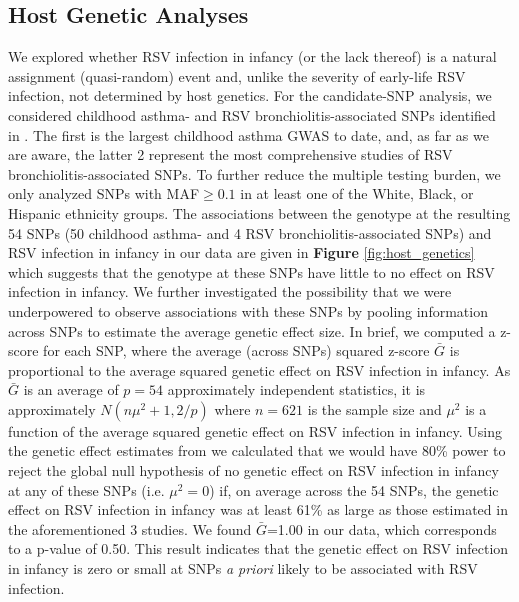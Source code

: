 \documentclass{article} %
\begin{document}
\clearpage	

\subsection{Host Genetic Analyses}
We explored whether RSV infection in infancy (or the lack thereof) is a natural assignment (quasi-random) event and, unlike the severity of early-life RSV infection,
\citep{larkin2015genes}
not determined by host genetics. 
For the candidate-SNP analysis, we considered childhood asthma- and RSV bronchiolitis-associated SNPs identified in 
\citet{pividori2019shared, janssen2007genetic, pasanen2017genome}.
The first is the largest childhood asthma GWAS to date, and, as far as we are aware, the latter 2 represent the most comprehensive studies of RSV bronchiolitis-associated SNPs. 
To further reduce the multiple testing burden, we only analyzed SNPs with MAF$\ge 0.1$ in at least one of the White, Black, or Hispanic ethnicity groups. 
The associations between the genotype at the resulting 54 SNPs (50 childhood asthma- and 4 RSV bronchiolitis-associated SNPs) and RSV infection in infancy in our data are given in 
\textbf{Figure} \ref{fig:host_genetics}
which suggests that the genotype at these SNPs have little to no effect on RSV infection in infancy. 
We further investigated the possibility that we were underpowered to observe associations with these SNPs by pooling information across SNPs to estimate the average genetic effect size. 
In brief, we computed a z-score for each SNP, where the average (across SNPs) squared z-score $\bar{G}$ is proportional to the average squared genetic effect on RSV infection in infancy. 
As $\bar{G}$ is an average of $p=54$ approximately independent statistics, 
it is approximately
$N(n\mu^2 + 1,2/p)$
where $n=621$ is the sample size and $\mu^2$ is a function of the average squared genetic effect on RSV infection in infancy. 
Using the genetic effect estimates from 
\citet{pividori2019shared, janssen2007genetic, pasanen2017genome}
we calculated that we would have 80\% power to reject the global null hypothesis of no genetic effect on RSV infection in infancy at any of these SNPs (i.e. $\mu^2 =0$) if, on average across the 54 SNPs, the genetic effect on RSV infection in infancy was at least 61\% as large as those estimated in the aforementioned 3 studies. 
We found $\bar{G}$=1.00 in our data, which corresponds to a p-value of 0.50. 
This result indicates that the genetic effect on RSV infection in infancy is zero or small at SNPs \textit{a priori} likely to be associated with RSV infection.	
\end{document}
